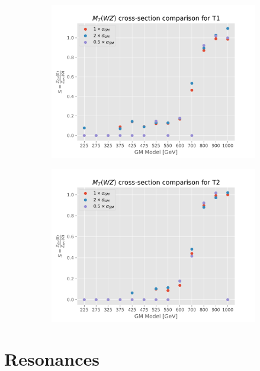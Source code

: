 \documentclass[../Bachelorarbeit.tex]{subfiles}
\begin{document}
\begin{figure}[h]
\begin{subfigure}{0.45\textwidth}
        \includegraphics[width=\textwidth]{Plots/gm_relevanze/MTWZ_comparision_T1.png}
        \caption{}
    \end{subfigure}
    \begin{subfigure}{0.45\textwidth}
        \includegraphics[width=\textwidth]{Plots/gm_relevanze/MTWZ_comparision_T2.png}
        \caption{}
    \end{subfigure}
    \caption{}
\end{figure}

\section{Resonances}
\label{sec:further_resonace}
\end{document}
